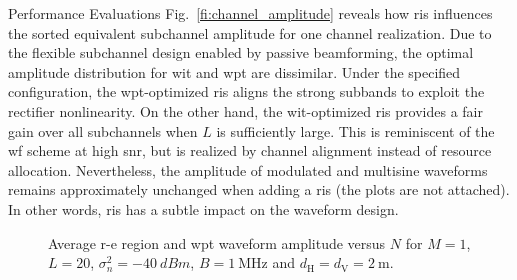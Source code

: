 \begin{section}{Performance Evaluations}
	Fig.~\ref{fi:channel_amplitude} reveals how \gls{ris} influences the sorted equivalent subchannel amplitude for one channel realization. Due to the flexible subchannel design enabled by passive beamforming, the optimal amplitude distribution for \gls{wit} and \gls{wpt} are dissimilar. Under the specified configuration, the \gls{wpt}-optimized \gls{ris} aligns the strong subbands to exploit the rectifier nonlinearity. On the other hand, the \gls{wit}-optimized \gls{ris} provides a fair gain over all subchannels when $L$ is sufficiently large. This is reminiscent of the \gls{wf} scheme at high \gls{snr}, but is realized by channel alignment instead of resource allocation. Nevertheless, the amplitude of modulated and multisine waveforms remains approximately unchanged when adding a \gls{ris} (the plots are not attached). In other words, \gls{ris} has a subtle impact on the waveform design.

	\begin{figure}[!t]
		\centering
		\caption{Average \gls{r-e} region and \gls{wpt} waveform amplitude versus $N$ for $M=1$, $L=20$, $\sigma_n^2=\qty{-40}{dBm}$, $B=\qty{1}{\MHz}$ and $d_{\mathrm{H}}=d_{\mathrm{V}}=\qty{2}{\meter}$.}
	\end{figure}


\end{section}
